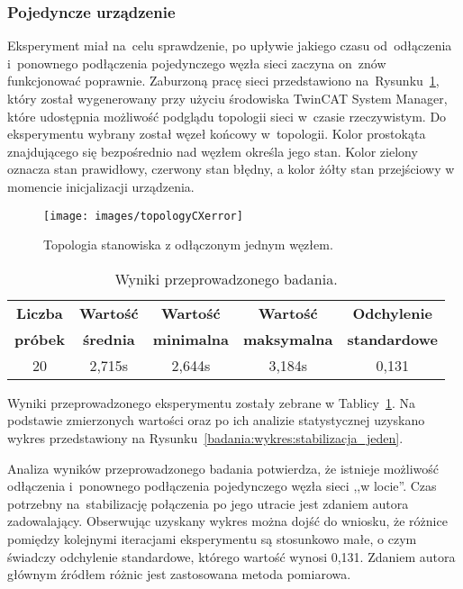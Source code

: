 \clearpage
\subsubsection{Pojedyncze urządzenie}
Eksperyment miał na~celu sprawdzenie, po upływie jakiego czasu od~odłączenia i~ponownego podłączenia pojedynczego węzła sieci zaczyna on~znów funkcjonować poprawnie. Zaburzoną pracę sieci przedstawiono na~Rysunku~\ref{one_slave}, który został wygenerowany przy użyciu środowiska TwinCAT System Manager, które udostępnia możliwość podglądu topologii sieci w~czasie rzeczywistym. Do eksperymentu wybrany został węzeł końcowy w~topologii. Kolor prostokąta znajdującego się bezpośrednio nad węzłem określa jego stan. Kolor zielony oznacza stan prawidłowy, czerwony stan błędny, a kolor żółty stan przejściowy w momencie inicjalizacji urządzenia. 
\begin{figure}[!htb] 	\centering 	\texttt{[image: images/topologyCXerror]} \caption{Topologia stanowiska z odłączonym jednym węzłem.} \label{one_slave} \end{figure}

\begin{table}[!htb]
\begin{center}
\begin{tabular}{| c | c | c | c | c |}\hline
\textbf{Liczba} & \textbf{Wartość} & \textbf{Wartość} & \textbf{Wartość} & \textbf{Odchylenie} \\
\textbf{próbek} & \textbf{średnia} & \textbf{minimalna} & \textbf{maksymalna} & \textbf{standardowe} \\\hline\hline
20 & 2,715s & 2,644s & 3,184s & 0,131\\\hline
\end{tabular}
\end{center}
\vspace*{-6mm}
  \caption{Wyniki przeprowadzonego badania.}
	\label{badania:wyniki:stabilizacja_jeden}
\end{table}

Wyniki przeprowadzonego eksperymentu zostały zebrane w Tablicy~\ref{badania:wyniki:stabilizacja_jeden}. Na podstawie zmierzonych wartości oraz po ich analizie statystycznej uzyskano wykres przedstawiony na Rysunku~\ref{badania:wykres:stabilizacja_jeden}.

Analiza wyników przeprowadzonego badania potwierdza, że istnieje możliwość odłączenia i~ponownego podłączenia pojedynczego węzła sieci ,,w locie''. Czas potrzebny na~stabilizację połączenia po jego utracie jest zdaniem autora zadowalający. Obserwując uzyskany wykres można dojść do wniosku, że różnice pomiędzy kolejnymi iteracjami eksperymentu są stosunkowo małe, o czym świadczy odchylenie standardowe, którego wartość wynosi 0,131. Zdaniem autora głównym źródłem różnic jest zastosowana metoda pomiarowa.
\clearpage

